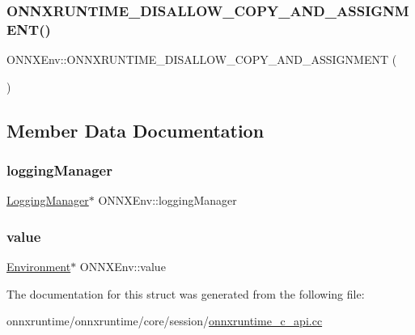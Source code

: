 \subsubsection{\texorpdfstring{O\+N\+N\+X\+R\+U\+N\+T\+I\+M\+E\+\_\+\+D\+I\+S\+A\+L\+L\+O\+W\+\_\+\+C\+O\+P\+Y\+\_\+\+A\+N\+D\+\_\+\+A\+S\+S\+I\+G\+N\+M\+E\+N\+T()}{ONNXRUNTIME\_DISALLOW\_COPY\_AND\_ASSIGNMENT()}}
{\footnotesize\ttfamily O\+N\+N\+X\+Env\+::\+O\+N\+N\+X\+R\+U\+N\+T\+I\+M\+E\+\_\+\+D\+I\+S\+A\+L\+L\+O\+W\+\_\+\+C\+O\+P\+Y\+\_\+\+A\+N\+D\+\_\+\+A\+S\+S\+I\+G\+N\+M\+E\+NT (\begin{DoxyParamCaption}\item[{\mbox{\hyperlink{structONNXEnv}{O\+N\+N\+X\+Env}}}]{ }\end{DoxyParamCaption})}



\subsection{Member Data Documentation}
\mbox{\label{structONNXEnv_acb6d205bd576c2702b73187839b9117c}} 
\subsubsection{\texorpdfstring{logging\+Manager}{loggingManager}}
{\footnotesize\ttfamily \mbox{\hyperlink{classonnxruntime_1_1logging_1_1LoggingManager}{Logging\+Manager}}$\ast$ O\+N\+N\+X\+Env\+::logging\+Manager}

\mbox{\label{structONNXEnv_a5189cb87f1e0eb6faa792361fc4ecb78}} 
\subsubsection{\texorpdfstring{value}{value}}
{\footnotesize\ttfamily \mbox{\hyperlink{classonnxruntime_1_1Environment}{Environment}}$\ast$ O\+N\+N\+X\+Env\+::value}



The documentation for this struct was generated from the following file\+:\begin{DoxyCompactItemize}
\item 
onnxruntime/onnxruntime/core/session/\mbox{\hyperlink{onnxruntime__c__api_8cc}{onnxruntime\+\_\+c\+\_\+api.\+cc}}\end{DoxyCompactItemize}
